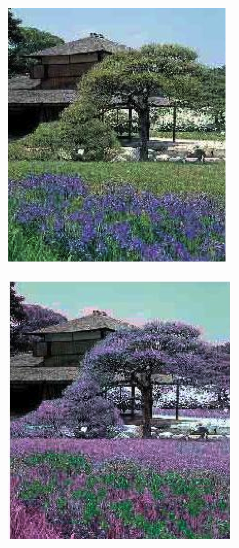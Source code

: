 \documentclass[10pt,twocolumn,letterpaper]{article}
\begin{document}
\begin{figure}[h]
  \centering
  \begin{subfigure}{0.22\textwidth}
    \includegraphics[width=\textwidth]{zen1.png}
    \caption{}
  \end{subfigure}
  \begin{subfigure}{0.22\textwidth}
    \includegraphics[width=\textwidth]{zen2.png}

\end{subfigure}
\end{figure}
\end{document}

